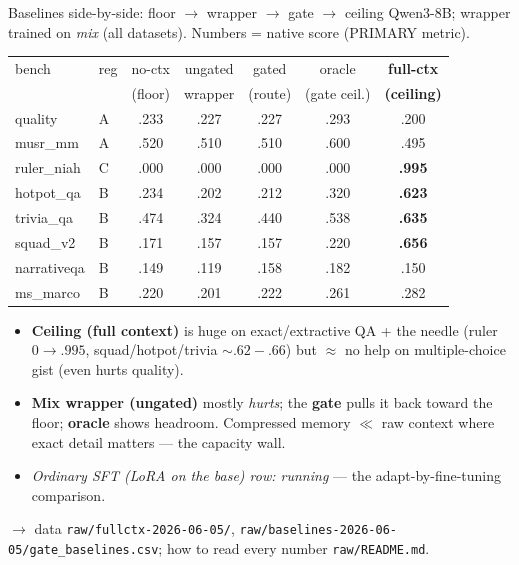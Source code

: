 \begin{frame}{Baselines side-by-side: floor $\to$ wrapper $\to$ gate $\to$ ceiling}
  \scriptsize Qwen3-8B; wrapper trained on \emph{mix} (all datasets). Numbers = native score (PRIMARY metric).
  \vspace{0.2em}
  \begin{center}
  \begin{tabular}{llccccc}
    \toprule
    bench & reg & no-ctx & ungated & gated & oracle & \textbf{full-ctx} \\
          &     & (floor) & wrapper & (route) & (gate ceil.) & \textbf{(ceiling)} \\
    \midrule
    quality      & A & .233 & .227 & .227 & .293 & .200 \\
    musr\_mm     & A & .520 & .510 & .510 & .600 & .495 \\
    ruler\_niah  & C & .000 & .000 & .000 & .000 & \textbf{.995} \\
    hotpot\_qa   & B & .234 & .202 & .212 & .320 & \textbf{.623} \\
    trivia\_qa   & B & .474 & .324 & .440 & .538 & \textbf{.635} \\
    squad\_v2    & B & .171 & .157 & .157 & .220 & \textbf{.656} \\
    narrativeqa  & B & .149 & .119 & .158 & .182 & .150 \\
    ms\_marco    & B & .220 & .201 & .222 & .261 & .282 \\
    \bottomrule
  \end{tabular}
  \end{center}
  \vspace{0.2em}
  \begin{itemize}\scriptsize
    \item \textbf{Ceiling (full context)} is huge on exact/extractive QA + the needle (ruler $0{\to}.995$, squad/hotpot/trivia ${\sim}.62{-}.66$) but $\approx$ no help on multiple-choice gist (even hurts quality).
    \item \textbf{Mix wrapper (ungated)} mostly \emph{hurts}; the \textbf{gate} pulls it back toward the floor; \textbf{oracle} shows headroom. Compressed memory $\ll$ raw context where exact detail matters --- the capacity wall.
    \item \emph{Ordinary SFT (LoRA on the base) row: running} --- the adapt-by-fine-tuning comparison.
  \end{itemize}
  \footnotesize $\rightarrow$ data \texttt{raw/fullctx-2026-06-05/}, \texttt{raw/baselines-2026-06-05/gate\_baselines.csv}; how to read every number \texttt{raw/README.md}.
\end{frame}

